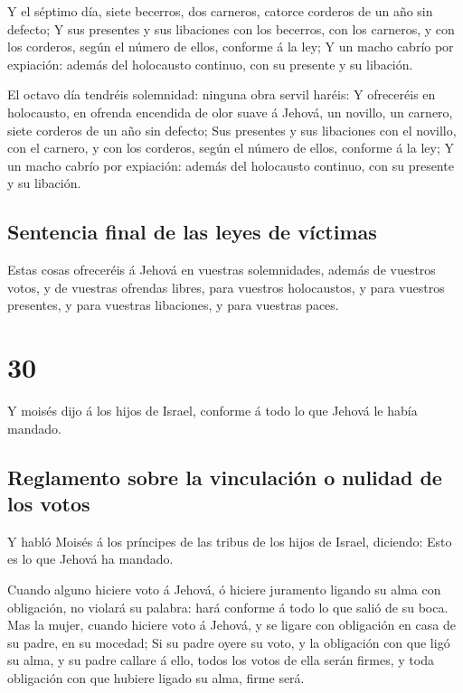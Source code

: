  Y el séptimo día, siete becerros, dos carneros, catorce
corderos de un año sin defecto;  Y sus presentes y sus
libaciones con los becerros, con los carneros, y con los corderos, según
el número de ellos, conforme á la ley;  Y un macho cabrío
por expiación: además del holocausto continuo, con su presente y su
libación.

 El octavo día tendréis solemnidad: ninguna obra servil
haréis:  Y ofreceréis en holocausto, en ofrenda encendida
de olor suave á Jehová, un novillo, un carnero, siete corderos de un año
sin defecto;  Sus presentes y sus libaciones con el
novillo, con el carnero, y con los corderos, según el número de ellos,
conforme á la ley;  Y un macho cabrío por expiación: además
del holocausto continuo, con su presente y su libación.

\hypertarget{sentencia-final-de-las-leyes-de-vuxedctimas}{%
\subsection{Sentencia final de las leyes de
víctimas}\label{sentencia-final-de-las-leyes-de-vuxedctimas}}

 Estas cosas ofreceréis á Jehová en vuestras solemnidades,
además de vuestros votos, y de vuestras ofrendas libres, para vuestros
holocaustos, y para vuestros presentes, y para vuestras libaciones, y
para vuestras paces. 

\hypertarget{section-29}{%
\section{30}\label{section-29}}

 Y moisés dijo á los hijos de Israel, conforme á todo lo que
Jehová le había mandado.

\hypertarget{reglamento-sobre-la-vinculaciuxf3n-o-nulidad-de-los-votos}{%
\subsection{Reglamento sobre la vinculación o nulidad de los
votos}\label{reglamento-sobre-la-vinculaciuxf3n-o-nulidad-de-los-votos}}

 Y habló Moisés á los príncipes de las tribus de los hijos
de Israel, diciendo: Esto es lo que Jehová ha mandado.

 Cuando alguno hiciere voto á Jehová, ó hiciere juramento
ligando su alma con obligación, no violará su palabra: hará conforme á
todo lo que salió de su boca.  Mas la mujer, cuando hiciere
voto á Jehová, y se ligare con obligación en casa de su padre, en su
mocedad;  Si su padre oyere su voto, y la obligación con que
ligó su alma, y su padre callare á ello, todos los votos de ella serán
firmes, y toda obligación con que hubiere ligado su alma, firme será.

